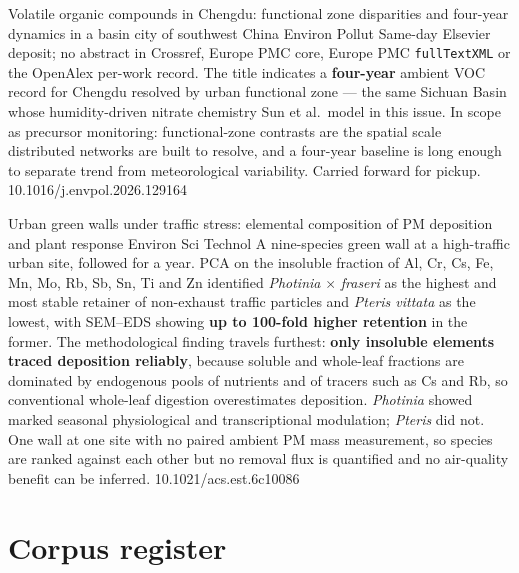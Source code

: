 \documentclass[10pt]{article}
\begin{document}
{Volatile organic compounds in Chengdu: functional zone disparities and four-year dynamics
in a basin city of southwest China}
{Environ Pollut}
{Same-day Elsevier deposit; no abstract in Crossref, Europe PMC core, Europe PMC
\texttt{fullTextXML} or the OpenAlex per-work record. The title indicates a \textbf{four-year}
ambient VOC record for Chengdu resolved by urban functional zone --- the same Sichuan Basin
whose humidity-driven nitrate chemistry Sun et al.\ model in this issue. In scope as
precursor monitoring: functional-zone contrasts are the spatial scale distributed networks
are built to resolve, and a four-year baseline is long enough to separate trend from
meteorological variability. Carried forward for pickup.}
{10.1016/j.envpol.2026.129164}


{Urban green walls under traffic stress: elemental composition of PM deposition and plant
response}
{Environ Sci Technol}
{A nine-species green wall at a high-traffic urban site, followed for a year. PCA on the
insoluble fraction of Al, Cr, Cs, Fe, Mn, Mo, Rb, Sb, Sn, Ti and Zn identified
\textit{Photinia} $\times$ \textit{fraseri} as the highest and most stable retainer of
non-exhaust traffic particles and \textit{Pteris vittata} as the lowest, with SEM--EDS
showing \textbf{up to 100-fold higher retention} in the former. The methodological finding
travels furthest: \textbf{only insoluble elements traced deposition reliably}, because
soluble and whole-leaf fractions are dominated by endogenous pools of nutrients and of
tracers such as Cs and Rb, so conventional whole-leaf digestion overestimates deposition.
\textit{Photinia} showed marked seasonal physiological and transcriptional modulation;
\textit{Pteris} did not. One wall at one site with no paired ambient PM mass measurement,
so species are ranked against each other but no removal flux is quantified and no
air-quality benefit can be inferred.}
{10.1021/acs.est.6c10086}


\clearpage

\section*{\sffamily\bfseries\color{Deep}Corpus register}
\vspace{-1.5mm}{\color{Amber}\rule{\linewidth}{1.1pt}}\vspace{2.5mm}
\end{document}
